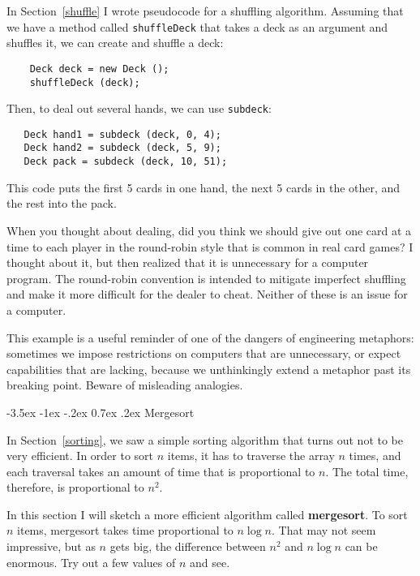 \documentclass{book}
\makeatletter
\renewcommand{\section}{\@startsection 
    {section} {1} {0mm}%
    {-3.5ex \@plus -1ex \@minus -.2ex}%
    {0.7ex \@plus.2ex}%
    {\normalfont\Large\bfseries}}
\makeatother
\begin{document}
In Section~\ref{shuffle} I wrote pseudocode for a shuffling algorithm.
Assuming that we have a method called {\tt shuffleDeck} that takes
a deck as an argument and shuffles it, we can create and shuffle
a deck:

\begin{verbatim}
    Deck deck = new Deck ();
    shuffleDeck (deck);
\end{verbatim}
%
Then, to deal out several hands, we can use {\tt subdeck}:

\begin{verbatim}
   Deck hand1 = subdeck (deck, 0, 4);
   Deck hand2 = subdeck (deck, 5, 9);
   Deck pack = subdeck (deck, 10, 51);
\end{verbatim}
%
This code puts the first 5 cards in one hand, the next 5 cards
in the other, and the rest into the pack.

When you thought about dealing, did you think we should give out one
card at a time to each player in the round-robin style that is common
in real card games?  I thought about it, but then realized that it is
unnecessary for a computer program.  The round-robin convention is
intended to mitigate imperfect shuffling and make it more difficult
for the dealer to cheat.  Neither of these is an issue for a computer.

This example is a useful reminder of one of the dangers of engineering
metaphors: sometimes we impose restrictions on computers that are
unnecessary, or expect capabilities that are lacking, because we
unthinkingly extend a metaphor past its breaking point.  Beware of
misleading analogies.


\section {Mergesort}
\label{mergesort}

In Section~\ref{sorting}, we saw a simple sorting algorithm that turns
out not to be very efficient.  In order to sort $n$ items, it has to
traverse the array $n$ times, and each traversal takes an amount of
time that is proportional to $n$.  The total time, therefore, is
proportional to $n^2$.

In this section I will sketch a more efficient algorithm called {\bf
mergesort}.  To sort $n$ items, mergesort takes time proportional to
$n \log n$.  That may not seem impressive, but as $n$ gets big, the
difference between $n^2$ and $n \log n$ can be enormous.  Try out a
few values of $n$ and see.
\end{document}
